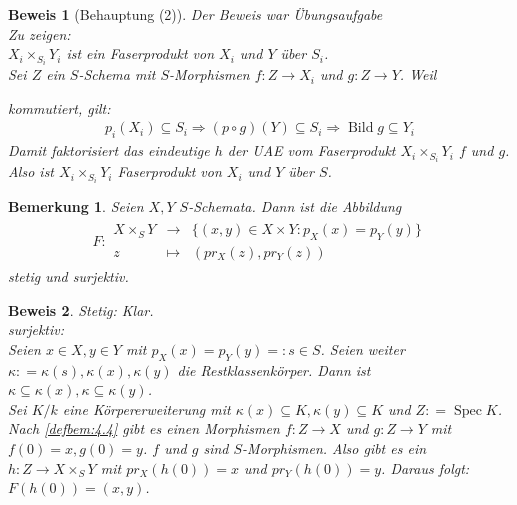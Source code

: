 \documentclass[a4paper,oneside]{scrbook}
\theoremstyle{break}
\newtheorem{Bem}[Def]{Bemerkung}
\theoremstyle{nonumberbreak}
\theoremstyle{nonumberplain}
\newtheorem{Bew}{Beweis}
\theoremstyle{break}
\newcommand{\defeqr}[0]{\mathrel{\mathop:}=}
\newcommand{\defeql}[0]{=\mathrel{\mathop:}}
\newcommand{\Abb}[5]{\ensuremath{#1:\begin{array}{ccc} #2 & \longrightarrow & #3 \\ #4 & \longmapsto & #5 \end{array}}}
\newcommand{\Spec}{%
	\ensuremath{\operatorname{Spec}}%
}
\DeclareMathOperator{\Bild}{Bild}
\begin{document}
\begin{Bew}[Behauptung (2)]
  \emph{Der Beweis war Übungsaufgabe} \\
  Zu zeigen:\\
  $X_i\times_{S_i}Y_i$ ist ein Faserprodukt von $X_i$ und $Y$ über $S_i$. \\
  Sei $Z$ ein $S$-Schema mit $S$-Morphismen $f:Z\to X_i$ und $g:Z\to Y$.
  Weil
  \begin{center}
  \end{center}
  kommutiert, gilt:
  \begin{align*}
    p_i(X_i)\subseteq S_i \Rightarrow (p\circ g)(Y)\subseteq S_i \Rightarrow  \Bild g\subseteq Y_i
  \end{align*}
  Damit faktorisiert das eindeutige $h$ der UAE vom Faserprodukt $X_i\times_{S_i}Y_i$ $f$ und $g$. Also
  ist $X_i\times_{S_i}Y_i$ Faserprodukt von $X_i$ und $Y$ über $S$.
\end{Bew}

\begin{Bem}
  \label{bem:5.2}
  Seien $X,Y$ $S$-Schemata. Dann ist die Abbildung
  \begin{align*}
    \Abb{F}{X\times_S Y}{\{(x,y)\in X\times Y:p_X(x)=p_Y(y)\}}{z}{(pr_X(z),pr_Y(z))}
  \end{align*}
  stetig und surjektiv.
\end{Bem}

\begin{Bew}
  Stetig: Klar. \\
  surjektiv: \\
  Seien $x\in X, y\in Y$ mit $p_X(x)=p_Y(y)\defeql s\in S$. Seien weiter $\kappa\defeqr\kappa(s),\kappa(x),\kappa(y)$ die Restklassenkörper.
  Dann ist $\kappa\subseteq\kappa(x), \kappa\subseteq\kappa(y)$. \\
  Sei $K/k$ eine Körpererweiterung mit $\kappa(x)\subseteq K, \kappa(y)\subseteq K$ und $Z\defeqr\Spec K$.
  Nach \ref{defbem:4.4} gibt es einen Morphismen $f:Z\to X$ und $g:Z\to Y$ mit $f(0)=x,g(0)=y$. $f$ und $g$ sind $S$-Morphismen.
  Also gibt es ein $h:Z\to X\times_S Y$ mit $pr_X(h(0))=x$ und $pr_Y(h(0))=y$. Daraus folgt: $F(h(0))=(x,y)$.
\end{Bew}
\end{document}
